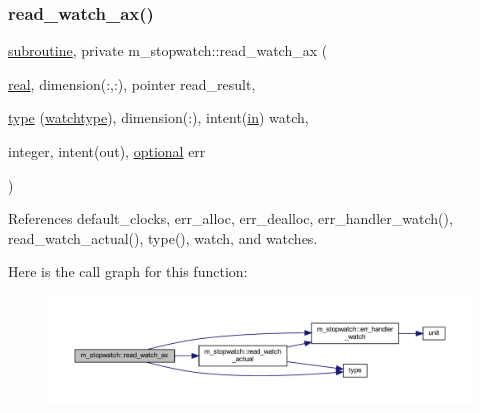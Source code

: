 \subsubsection{\texorpdfstring{read\+\_\+watch\+\_\+ax()}{read\_watch\_ax()}}
{\footnotesize\ttfamily \hyperlink{M__stopwatch_83_8txt_acfbcff50169d691ff02d4a123ed70482}{subroutine}, private m\+\_\+stopwatch\+::read\+\_\+watch\+\_\+ax (\begin{DoxyParamCaption}\item[{\hyperlink{read__watch_83_8txt_abdb62bde002f38ef75f810d3a905a823}{real}, dimension(\+:,\+:), pointer}]{read\+\_\+result,  }\item[{\hyperlink{stop__watch_83_8txt_a70f0ead91c32e25323c03265aa302c1c}{type} (\hyperlink{structm__stopwatch_1_1watchtype}{watchtype}), dimension(\+:), intent(\hyperlink{M__journal_83_8txt_afce72651d1eed785a2132bee863b2f38}{in})}]{watch,  }\item[{integer, intent(out), \hyperlink{option__stopwatch_83_8txt_aa4ece75e7acf58a4843f70fe18c3ade5}{optional}}]{err }\end{DoxyParamCaption})\hspace{0.3cm}{\ttfamily [private]}}



References default\+\_\+clocks, err\+\_\+alloc, err\+\_\+dealloc, err\+\_\+handler\+\_\+watch(), read\+\_\+watch\+\_\+actual(), type(), watch, and watches.

Here is the call graph for this function\+:
\nopagebreak
\begin{figure}[H]
\begin{center}
\leavevmode
\includegraphics[width=350pt]{namespacem__stopwatch_a653b0acb543b4a6f4d75babffe91e8c8_cgraph}
\end{center}
\end{figure}
\mbox{\label{namespacem__stopwatch_aeff00ff26ea56c282f257e7fa03d2319}} 

